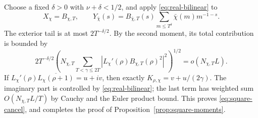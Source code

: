 Choose a fixed $\delta>0$ with $\nu+\delta<1/2$, and apply
\eqref{eq:real-bilinear} to
\[
 X_\chi=B_{\chi,T},\qquad
 Y_{\bar\chi}(s)=B_{\bar\chi,T}(s)
            \sum_{m\le T^\delta}\bar\chi(m)m^{-1-s}.
\]
The exterior tail is at most $2T^{-\delta/2}$. By the second moment,
its total contribution is bounded by
\[
 2T^{-\delta/2}
 \left(N_{\chi,T}\sum_{T<\gamma\le2T}
             |L_\chi'(\rho)B_{\chi,T}(\rho)^2|^2\right)^{1/2}
       =o(N_{\chi,T}L).
\]
If $L_\chi'(\rho)\overline{L_\chi(\rho+1)}=u+iv$, then exactly
$K_{\rho,\chi}=v+u/(2\gamma)$. The imaginary part is controlled
by \eqref{eq:real-bilinear}; the last term has weighted sum
$O(N_{\chi,T}L/T)$ by Cauchy and the Euler product bound.
This proves \eqref{eq:square-cancel}, and completes the proof of
Proposition~\ref{prop:square-moments}.
